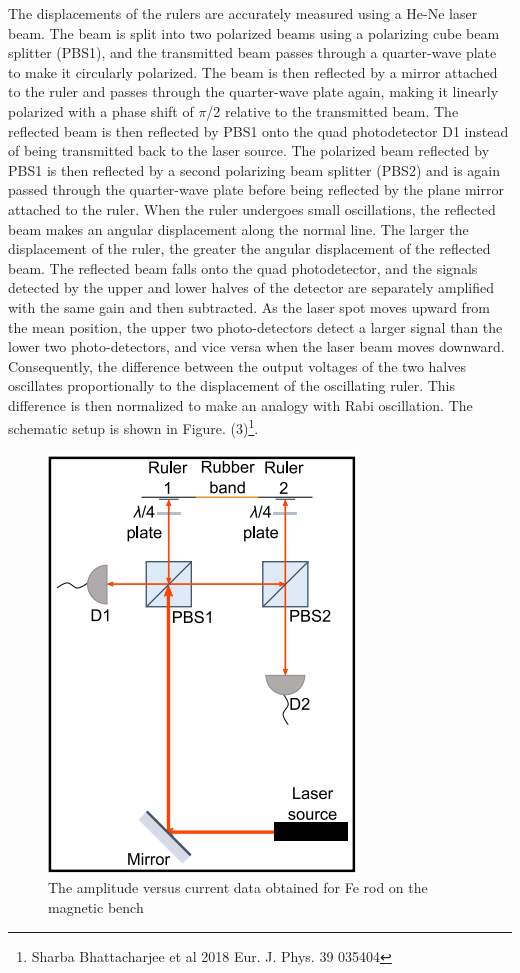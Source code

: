 The displacements of the rulers are accurately measured using a He-Ne laser beam. The beam is split into two polarized beams using a polarizing cube beam splitter (PBS1), and the transmitted beam passes through a quarter-wave plate to make it circularly polarized. The beam is then reflected by a mirror attached to the ruler and passes through the quarter-wave plate again, making it linearly polarized with a phase shift of $\pi$/2 relative to the transmitted beam. The reflected beam is then reflected by PBS1 onto the quad photodetector D1 instead of being transmitted back to the laser source. The polarized beam reflected by PBS1 is then reflected by a second polarizing beam splitter (PBS2) and is again passed through the quarter-wave plate before being reflected by the plane mirror attached to the ruler. When the ruler undergoes small oscillations, the reflected beam makes an angular displacement along the normal line. The larger the displacement of the ruler, the greater the angular displacement of the reflected beam. The reflected beam falls onto the quad photodetector, and the signals detected by the upper and lower halves of the detector are separately amplified with the same gain and then subtracted. As the laser spot moves upward from the mean position, the upper two photo-detectors detect a larger signal than the lower two photo-detectors, and vice versa when the laser beam moves downward. Consequently, the difference between the output voltages of the two halves oscillates proportionally to the displacement of the oscillating ruler. This difference is then normalized to make an analogy with Rabi oscillation. The schematic setup is shown in Figure. (3)\footnote{Sharba Bhattacharjee et al 2018 Eur. J. Phys. 39 035404}.
\begin{figure}[H]
	\centering
	\includegraphics[scale=0.8]{setup diagram.png}
	\caption{The amplitude versus current data obtained for Fe rod on the magnetic bench}
	\label{fig:mb-fe-0}
\end{figure}
